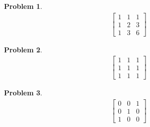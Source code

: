 \documentclass{article}
\newtheorem{problem}{Problem}
\begin{document}
\begin{problem}
\begin{align*}
\begin{bmatrix}
1 & 1 & 1 \\
1 & 2 & 3 \\
1 & 3 & 6
\end{bmatrix}
\end{align*}
\end{problem}

\begin{problem}
\begin{align*}
\begin{bmatrix}
1 & 1 & 1 \\
1 & 1 & 1 \\
1 & 1 & 1
\end{bmatrix}
\end{align*}
\end{problem}

\begin{problem}
\begin{align*}
\begin{bmatrix}
0 & 0 & 1 \\
0 & 1 & 0 \\
1 & 0 & 0
\end{bmatrix}
\end{align*}
\end{problem}
\end{document}
